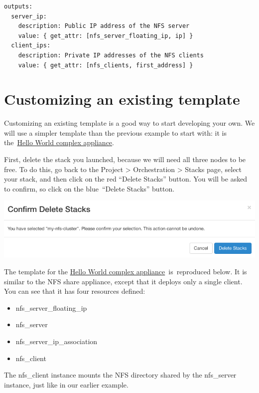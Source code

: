\begin{footnotesize}
\begin{verbatim}
outputs:
  server_ip:
    description: Public IP address of the NFS server
    value: { get_attr: [nfs_server_floating_ip, ip] }
  client_ips:
    description: Private IP addresses of the NFS clients
    value: { get_attr: [nfs_clients, first_address] }
\end{verbatim}
\end{footnotesize}

\section{Customizing an existing template}

Customizing an existing template is a good way to start developing your
own. We will use a simpler template than the previous example to start
with: it is
the~\href{https://www.chameleoncloud.org/appliances/26/}{Hello World
complex appliance}.

First, delete the stack you launched, because we will need all three
nodes to be free. To do this, go back to the Project \textgreater{}
Orchestration \textgreater{} Stacks page, select your stack, and then
click on the red ``Delete Stacks'' button. You will be asked to confirm,
so click on the blue~``Delete Stacks'' button.

\includegraphics[width=\columnwidth]{images/chameleon/Delete-Stacks.png}

The template for the
\href{https://www.chameleoncloud.org/appliances/26/}{Hello World complex
appliance}~is~reproduced below. It is similar to the NFS share
appliance, except that it deploys only a single client. You can see that
it has four resources defined:

\begin{itemize}
\item
  nfs\_server\_floating\_ip
\item
  nfs\_server
\item
  nfs\_server\_ip\_association
\item
  nfs\_client
\end{itemize}

The nfs\_client instance mounts the NFS directory shared by the
nfs\_server instance, just like in our earlier example.

